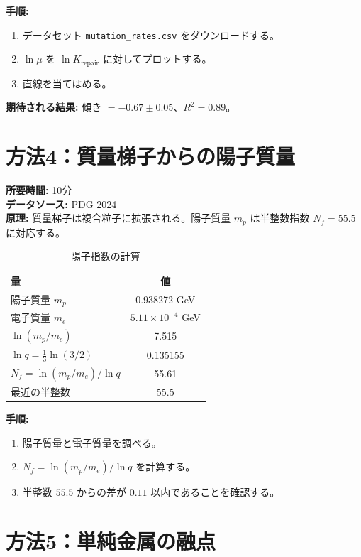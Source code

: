 \documentclass[12pt,a4paper]{article}
\begin{document}
	\textbf{手順:}
	\begin{enumerate}[label=(\arabic*)]
		\item データセット \texttt{mutation\_rates.csv} をダウンロードする。
		\item \(\ln \mu\) を \(\ln K_{\text{repair}}\) に対してプロットする。
		\item 直線を当てはめる。
	\end{enumerate}
	
	\textbf{期待される結果:} 傾き \(= -0.67 \pm 0.05\)、\(R^2 = 0.89\)。
	
	\section{方法4：質量梯子からの陽子質量}
	\label{sec:proton}
	
	\textbf{所要時間:} 10分\\
	\textbf{データソース:} PDG 2024 \cite{PDG2024}\\
	\textbf{原理:} 質量梯子は複合粒子に拡張される。陽子質量 \(m_p\) は半整数指数 \(N_f = 55.5\) に対応する。
	
	\begin{table}[H]
		\centering
		\caption{陽子指数の計算}
		\label{tab:proton}
		\begin{tabular}{l c}
			\toprule
			量 & 値 \\
			\midrule
			陽子質量 \(m_p\) & 0.938272 GeV \\
			電子質量 \(m_e\) & \(5.11\times10^{-4}\) GeV \\
			\(\ln(m_p/m_e)\) & 7.515 \\
			\(\ln q = \frac{1}{3}\ln(3/2)\) & 0.135155 \\
			\(N_f = \ln(m_p/m_e)/\ln q\) & 55.61 \\
			最近の半整数 & 55.5 \\
			\bottomrule
		\end{tabular}
	\end{table}
	
	\textbf{手順:}
	\begin{enumerate}[label=(\arabic*)]
		\item 陽子質量と電子質量を調べる。
		\item \(N_f = \ln(m_p / m_e) / \ln q\) を計算する。
		\item 半整数 \(55.5\) からの差が \(0.11\) 以内であることを確認する。
	\end{enumerate}
	
	\section{方法5：単純金属の融点}
	\label{sec:melting}
	
\end{document}
